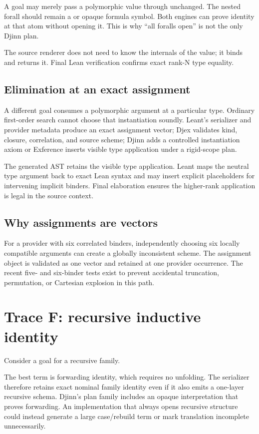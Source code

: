 \documentclass[10pt,letterpaper,oneside]{report}
\newcommand{\code}[1]{\texttt{\detokenize{#1}}}
\begin{document}
A goal may merely pass a polymorphic value through unchanged. The nested forall should remain a \code{TypeAtom} or opaque formula symbol. Both engines can prove identity at that atom without opening it. This is why ``all foralls open'' is not the only Djinn plan.

The source renderer does not need to know the internals of the value; it binds and returns it. Final Lean verification confirms exact rank-N type equality.

\subsection{Elimination at an exact assignment}

A different goal consumes a polymorphic argument at a particular type. Ordinary first-order search cannot choose that instantiation soundly. Leant's serializer and provider metadata produce an exact assignment vector; Djex validates kind, closure, correlation, and source scheme; Djinn adds a controlled instantiation axiom or Exference inserts visible type application under a rigid-scope plan.

The generated AST retains the visible type application. Leant maps the neutral type argument back to exact Lean syntax and may insert explicit placeholders for intervening implicit binders. Final elaboration ensures the higher-rank application is legal in the source context.

\subsection{Why assignments are vectors}

For a provider with six correlated binders, independently choosing six locally compatible arguments can create a globally inconsistent scheme. The assignment object is validated as one vector and retained at one provider occurrence. The recent five- and six-binder tests exist to prevent accidental truncation, permutation, or Cartesian explosion in this path.

\section{Trace F: recursive inductive identity}

Consider a goal \code{Tree a -> Tree a} for a recursive family.

The best term is forwarding identity, which requires no unfolding. The serializer therefore retains exact nominal family identity even if it also emits a one-layer recursive schema. Djinn's plan family includes an opaque interpretation that proves forwarding. An implementation that always opens recursive structure could instead generate a large case/rebuild term or mark translation incomplete unnecessarily.
\end{document}
